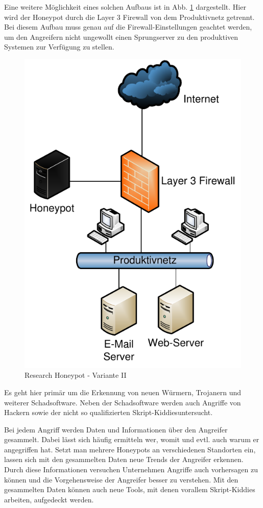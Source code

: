 Eine weitere Möglichkeit eines solchen Aufbaus ist in Abb. \ref{hnet:reHon2} dargestellt. Hier wird der Honeypot durch die Layer 3 Firewall von dem Produktivnetz getrennt. Bei diesem Aufbau muss genau auf die Firewall-Einstellungen geachtet werden, um den Angreifern nicht ungewollt einen Sprungserver zu den produktiven Systemen zur Verfügung zu stellen.

\begin{figure}[ht]
  \centering\includegraphics[scale=0.6]{Bilder/Research_2.pdf}
  \caption{Research Honeypot - Variante II}
  \label{hnet:reHon2}
\end{figure}
Es geht hier primär um die Erkennung von neuen Würmern, Trojanern und weiterer Schadsoftware. Neben der Schadsoftware werden auch Angriffe von Hackern sowie der nicht so qualifizierten \glqq Skript-Kiddies\grqq untersucht.

Bei jedem Angriff werden Daten und Informationen über den Angreifer gesammelt. Dabei lässt sich häufig ermitteln wer, womit und evtl. auch warum er angegriffen hat. Setzt man mehrere Honeypots an verschiedenen Standorten ein, lassen sich mit den gesammelten Daten neue Trends der Angreifer erkennen. Durch diese Informationen versuchen Unternehmen Angriffe auch vorhersagen zu können und die Vorgehensweise der Angreifer besser zu verstehen. Mit den gesammelten Daten können auch neue Tools, mit denen vorallem Skript-Kiddies arbeiten, aufgedeckt werden.

